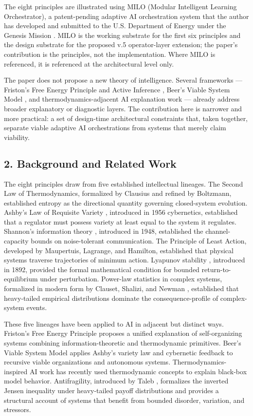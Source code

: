 The eight principles are illustrated using MILO (Modular Intelligent
Learning Orchestrator), a patent-pending adaptive AI orchestration
system \cite{ref1} that the author has developed and submitted to the U.S.
Department of Energy under the Genesis Mission \cite{ref2}. MILO is the
working substrate for the first six principles and the design substrate
for the proposed v.5 operator-layer extension; the paper's contribution
is the principles, not the implementation. Where MILO is referenced, it
is referenced at the architectural level only.

The paper does not propose a new theory of intelligence. Several
frameworks --- Friston's Free Energy Principle and Active Inference
\cite{ref3}, Beer's Viable System Model \cite{ref4}, and thermodynamics-adjacent
AI explanation work \cite{ref5} --- already address broader explanatory or
diagnostic layers. The contribution here is narrower and more practical:
a set of design-time architectural constraints that, taken together,
separate viable adaptive AI orchestrations from systems that merely
claim viability.

\subsection{2. Background and Related
Work}\label{background-and-related-work}

The eight principles draw from five established intellectual lineages.
The Second Law of Thermodynamics, formalized by Clausius and refined by
Boltzmann, established entropy as the directional quantity governing
closed-system evolution. Ashby's Law of Requisite Variety \cite{ref6},
introduced in 1956 cybernetics, established that a regulator must
possess variety at least equal to the system it regulates. Shannon's
information theory \cite{ref7}, introduced in 1948, established the
channel-capacity bounds on noise-tolerant communication. The Principle
of Least Action, developed by Maupertuis, Lagrange, and Hamilton,
established that physical systems traverse trajectories of minimum
action. Lyapunov stability \cite{ref8}, introduced in 1892, provided the
formal mathematical condition for bounded return-to-equilibrium under
perturbation. Power-law statistics in complex systems, formalized in
modern form by Clauset, Shalizi, and Newman \cite{ref9}, established that
heavy-tailed empirical distributions dominate the consequence-profile of
complex-system events.

These five lineages have been applied to AI in adjacent but distinct
ways. Friston's Free Energy Principle \cite{ref3} proposes a unified
explanation of self-organizing systems combining information-theoretic
and thermodynamic primitives. Beer's Viable System Model \cite{ref4} applies
Ashby's variety law and cybernetic feedback to recursive viable
organizations and autonomous systems. Thermodynamics-inspired AI work
\cite{ref5} has recently used thermodynamic concepts to explain black-box
model behavior. Antifragility, introduced by Taleb \cite{ref10}, formalizes
the inverted Jensen inequality under heavy-tailed payoff distributions
and provides a structural account of systems that benefit from bounded
disorder, variation, and stressors.


